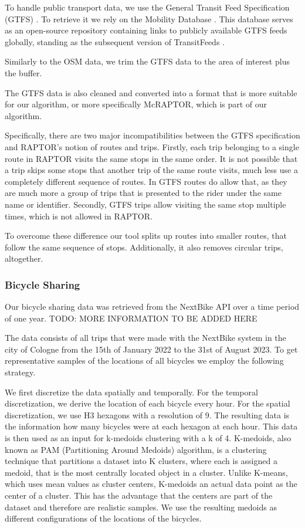 To handle public transport data, we use the General Transit Feed Specification (GTFS) .
To retrieve it we rely on the Mobility Database .
This database serves as an open-source repository containing links to publicly available GTFS feeds globally, standing as the subsequent version of TransitFeeds .

Similarly to the OSM data, we trim the GTFS data to the area of interest plus the buffer.

The GTFS data is also cleaned and converted into a format that is more suitable for our algorithm, or more specifically McRAPTOR, which is part of our algorithm.

Specifically, there are two major incompatibilities between the GTFS specification and RAPTOR's notion of routes and trips.
Firstly, each trip belonging to a single route in RAPTOR visits the same stops in the same order.
It is not possible that a trip skips some stops that another trip of the same route visits, much less use a completely different sequence of routes.
In GTFS routes do allow that, as they are much more a group of trips that is presented to the rider under the same name or identifier.
Secondly, GTFS trips allow visiting the same stop multiple times, which is not allowed in RAPTOR.

To overcome these difference our tool splits up routes into smaller routes, that follow the same sequence of stops.
Additionally, it also removes circular trips, altogether.


\subsubsection{Bicycle Sharing}
\label{subs:bicycle_sharing}

Our bicycle sharing data was retrieved from the NextBike API over a time period of one year.
TODO: MORE INFORMATION TO BE ADDED HERE

The data consists of all trips that were made with the NextBike system in the city of Cologne from the 15th of January 2022 to the 31st of August 2023.
To get representative samples of the locations of all bicycles we employ the following strategy.

We first discretize the data spatially and temporally.
For the temporal discretization, we derive the location of each bicycle every hour.
For the spatial discretization, we use H3 hexagons with a resolution of 9.
The resulting data is the information how many bicycles were at each hexagon at each hour.
This data is then used as an input for k-medoids clustering  with a k of 4.
K-medoids, also known as PAM (Partitioning Around Medoids) algorithm, is a clustering technique that partitions a dataset into K clusters, where each is assigned a medoid, that is the most centrally located object in a cluster. 
Unlike K-means, which uses mean values as cluster centers, K-medoids an actual data point as the center of a cluster.
This has the advantage that the centers are part of the dataset and therefore are realistic samples.
We use the resulting medoids as different configurations of the locations of the bicycles.

